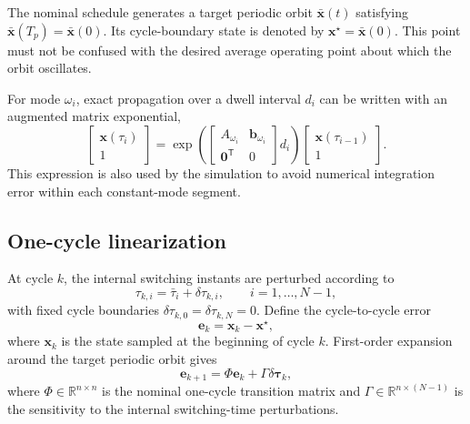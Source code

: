 \documentclass[11pt]{article}
\newcommand{\R}{\mathbb{R}}
\newcommand{\vect}[1]{\bm{#1}}
\newcommand{\dtau}{\delta\vect{\tau}}
\begin{document}
The nominal schedule generates a target periodic orbit $\bar{\vect{x}}(t)$ satisfying
$\bar{\vect{x}}(T_p)=\bar{\vect{x}}(0)$. Its cycle-boundary state is denoted by
$\vect{x}^\star=\bar{\vect{x}}(0)$. This point must not be confused with the desired average operating point about which the orbit oscillates.

For mode $\omega_i$, exact propagation over a dwell interval $d_i$ can be written with an augmented matrix exponential,
\begin{equation}
\begin{bmatrix}
    \vect{x}(\tau_i)\\ 1
\end{bmatrix}
=
\exp\!\left(
\begin{bmatrix}
    A_{\omega_i} & \vect{b}_{\omega_i}\\
    \vect{0}^{\mathsf T} & 0
\end{bmatrix}d_i
\right)
\begin{bmatrix}
    \vect{x}(\tau_{i-1})\\ 1
\end{bmatrix}.
\label{eq:exact-propagation}
\end{equation}
This expression is also used by the simulation to avoid numerical integration error within each constant-mode segment.

\subsection{One-cycle linearization}

At cycle $k$, the internal switching instants are perturbed according to
\begin{equation}
    \tau_{k,i}=\bar\tau_i+\delta\tau_{k,i},
    \qquad i=1,\ldots,N-1,
\end{equation}
with fixed cycle boundaries $\delta\tau_{k,0}=\delta\tau_{k,N}=0$. Define the cycle-to-cycle error
\begin{equation}
    \vect{e}_k=\vect{x}_k-\vect{x}^{\star},
\end{equation}
where $\vect{x}_k$ is the state sampled at the beginning of cycle $k$. First-order expansion around the target periodic orbit gives \cite{marcolino2021,vieira2024}
\begin{equation}
    \vect{e}_{k+1}=\Phi\vect{e}_k+\Gamma\dtau_k,
    \label{eq:cycle-model}
\end{equation}
where $\Phi\in\R^{n\times n}$ is the nominal one-cycle transition matrix and
$\Gamma\in\R^{n\times(N-1)}$ is the sensitivity to the internal switching-time perturbations.
\end{document}
